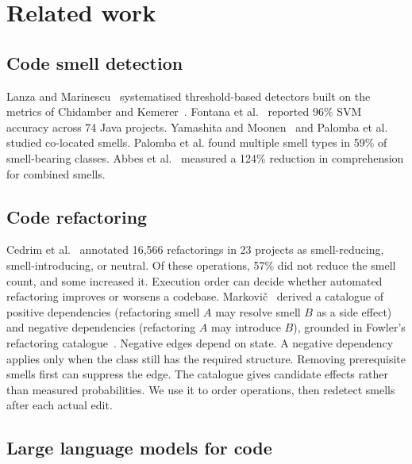 \documentclass[conference]{IEEEtran}
\begin{document}
\section{Related work}

\subsection{Code smell detection}

Lanza and Marinescu~\cite{lanza2006object} systematised threshold-based
detectors built on the metrics of Chidamber and Kemerer~\cite{chidamber1994metrics}.
Fontana et al.~\cite{fontana2016comparing} reported 96\% SVM accuracy across 74
Java projects. Yamashita and Moonen~\cite{yamashita2013exploring} and Palomba
et al.~\cite{palomba2018diffuseness} studied co-located smells. Palomba et al.
found multiple smell types in 59\% of smell-bearing classes. Abbes et
al.~\cite{abbes2011empirical} measured a 124\% reduction in comprehension for
combined smells.

\subsection{Code refactoring}

Cedrim et al.~\cite{cedrim2017} annotated 16,566 refactorings in 23 projects as
smell-reducing, smell-introducing, or neutral. Of these operations, 57\% did not
reduce the smell count, and some increased it.
Execution order can decide whether automated refactoring improves or worsens a
codebase.
Markovič~\cite{markovic2016refaktorovanie} derived a catalogue of
positive dependencies (refactoring smell $A$ may resolve smell $B$ as a side
effect) and negative dependencies (refactoring $A$ may introduce $B$),
grounded in Fowler's refactoring catalogue~\cite{Fowler1999}.
Negative edges depend on state. A negative dependency applies only when the
class still has the required structure. Removing prerequisite smells first can
suppress the edge. The catalogue gives
candidate effects rather than measured probabilities. We use it to order
operations, then redetect smells after each actual edit.

\subsection{Large language models for code}
\end{document}
